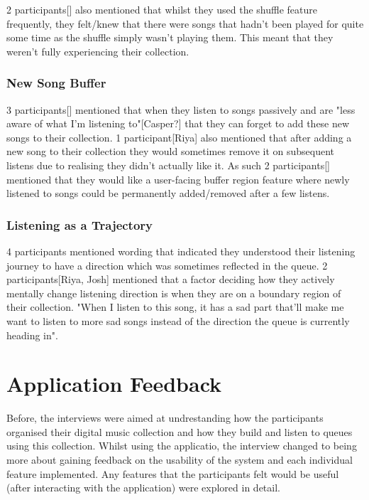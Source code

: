 2 participants[] also mentioned that whilst they used the shuffle feature frequently, they felt/knew that there were songs that hadn't been played for quite some time as the shuffle simply wasn't playing them. This meant that they weren't fully experiencing their collection.

\subsubsection{New Song Buffer}
3 participants[] mentioned that when they listen to songs passively and are "less aware of what I'm listening to"[Casper?] that they can forget to add these new songs to their collection. 1 participant[Riya] also mentioned that after adding a new song to their collection they would sometimes remove it on subsequent listens due to realising they didn't actually like it. As such 2 participants[] mentioned that they would like a user-facing buffer region feature where newly listened to songs could be permanently added/removed after a few listens.%

\subsubsection{Listening as a Trajectory}
4 participants mentioned wording that indicated they understood their listening journey to have a direction which was sometimes reflected in the queue. 2 participants[Riya, Josh] mentioned that a factor deciding how they actively mentally change listening direction is when they are on a boundary region of their collection. "When I listen to this song, it has a sad part that'll make me want to listen to more sad songs instead of the direction the queue is currently heading in".

\section{Application Feedback}
Before, the interviews were aimed at undrestanding how the participants organised their digital music collection and how they build and listen to queues using this collection. Whilst using the applicatio, the interview changed to being more about gaining feedback on the usability of the system and each individual feature implemented. Any features that the participants felt would be useful (after interacting with the application) were explored in detail.

